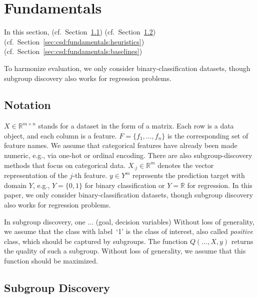 \documentclass{article}
\theoremstyle{definition}
\begin{document}
\section{Fundamentals}
\label{sec:csd:fundamentals}

In this section, (cf.~Section~\ref{sec:csd:fundamentals:notation}) (cf.~Section~\ref{sec:csd:fundamentals:subgroup-discovery}) (cf.~Section~\ref{sec:csd:fundamentals:heuristics}) (cf.~Section~\ref{sec:csd:fundamentals:baselines})

\cite{helal2016subgroup} \cite{herrera2011overview} \cite{atzmueller2015subgroup} \cite{ventura2018subgroup} \cite{meeng2021real}

To harmonize evaluation, we only consider binary-classification datasets, though subgroup discovery also works for regression problems.

\subsection{Notation}
\label{sec:csd:fundamentals:notation}

$X \in \mathbb{R}^{m \times n}$ stands for a dataset in the form of a matrix.
Each row is a data object, and each column is a feature.
$F = \{f_1, \dots, f_n\}$ is the corresponding set of feature names.
We assume that categorical features have already been made numeric, e.g., via one-hot or ordinal encoding.
There are also subgroup-discovery methods that focus on categorical data.
$X_{\cdot{}j} \in \mathbb{R}^m$ denotes the vector representation of the $j$-th feature.
$y \in Y^m$ represents the prediction target with domain $Y$, e.g., $Y=\{0,1\}$ for binary classification or $Y=\mathbb{R}$ for regression.
In this paper, we only consider binary-classification datasets, though subgroup discovery also works for regression problems.

In subgroup discovery, one ... (goal, decision variables)
Without loss of generality, we assume that the class with label~`1' is the class of interest, also called \emph{positive} class, which should be captured by subgroups.
The function $Q(...,X,y)$ returns the quality of such a subgroup.
Without loss of generality, we assume that this function should be maximized.

\subsection{Subgroup Discovery}
\label{sec:csd:fundamentals:subgroup-discovery}
\end{document}
